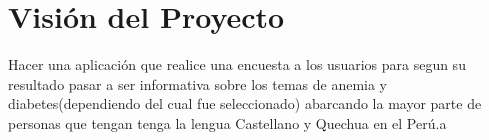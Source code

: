 \chapter{Visión del Proyecto}
Hacer una aplicación que realice una encuesta a los usuarios para segun su resultado pasar a ser  informativa sobre los temas de anemia
y diabetes(dependiendo del cual fue seleccionado) abarcando la mayor parte de personas que tengan
tenga la lengua Castellano y Quechua en el Perú.a